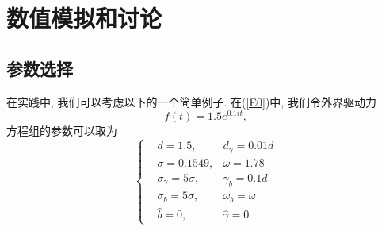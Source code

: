 \documentclass[notitlepage,cs4size,punct,oneside]{ctexrep}
\numberwithin{equation}{section}
\theoremstyle{mystyle}
\begin{document}
\section{数值模拟和讨论}


\subsection{参数选择}
在实践中, 我们可以考虑以下的一个简单例子. 在(\ref{E0})中, 我们令外界驱动力
$$f(t) = 1.5e^{0.1it},$$方程组的参数可以取为
\begin{equation} \label{parameters}
\left\{
\begin{aligned}
&d = 1.5,  &d_\gamma = 0.01d\\
&\sigma = 0.1549,& \omega = 1.78 \\
&\sigma_\gamma = 5\sigma, &\gamma_b = 0.1d \\
&\sigma_b = 5\sigma, &\omega_b = \omega \\
&\hat{b} = 0, &\hat\gamma = 0
\end{aligned}
\right.
\end{equation}
\end{document}

